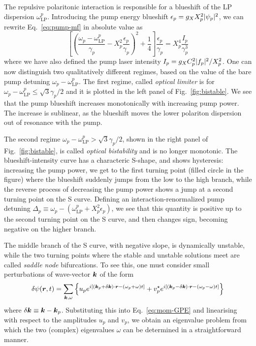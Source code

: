 The repulsive polaritonic interaction is responsible for a blueshift
of the LP dispersion $\omega_{\text{LP}}^{p}$.  Introducing the pump energy blueshift
$\epsilon_p = g_X X_p^2 \vert \psi_p \vert^2$, we can rewrite
Eq.~\eqref{eq:pump-mf} in absolute value as
%
\begin{equation}\label{eq:pump-mf-sq}
  \left[\left(\frac{\omega_p-\omega^p_{\text{LP}}}{\gamma_p} - X_p^2 \frac{\epsilon_p}{\gamma_p}\right)^2 + \frac{1}{4} \right] \frac{\epsilon_p}{\gamma_p} = X_p^4 \frac{I_p}{\gamma_p^3}
\end{equation}
%
where we have also defined the pump laser intensity
$I_p = g_X C_p^2 \vert f_p \vert^2/X_p^2$. One can now distinguish two
qualitatively different regimes, based on the value of the bare pump
detuning $\omega_p-\omega^p_{\text{LP}}$. The first regime, called
\textit{optical limiter} is for
$\omega_p-\omega^p_{\text{LP}} \leq \sqrt{3}\gamma_p/2$ and it is
plotted in the left panel of Fig.~\ref{fig:bistable}. We see that the
pump blueshift increases monotonically with increasing pump power. The
increase is sublinear, as the blueshift moves the lower polariton
dispersion out of resonance with the pump.

The second regime
$\omega_p-\omega^p_{\text{LP}} > \sqrt{3}\gamma_p/2$, shown in the
right panel of Fig.~\ref{fig:bistable}, is called \textit{optical
  bistability} and is no longer monotonic. The blueshift-intensity
curve has a characteric S-shape, and shows hysteresis: increasing the
pump power, we get to the first turning point (filled circle in the
figure) where the blueshift suddenly jumps from the low to the high
branch, while the reverse process of decreasing the pump power shows a
jump at a second turning point on the S curve. Defining an
interaction-renormalized pump detuning
$\Delta_p \equiv \omega_p-(\omega^p_{\text{LP}} + X_p^2\epsilon_p)$,
we see that this quantity is positive up to the second turning point
on the S curve, and then changes sign, becoming negative on the higher
branch.

The middle branch of the S curve, with negative slope, is dynamically
unstable, while the two turning points where the stable and unstable
solutions meet are called \textit{saddle node} bifurcations.  To see
this, one must consider small perturbations of wave-vector $\bm{k}$ of
the form
%
\begin{equation}\label{eq:pump-fluctuations}
  \delta \psi(\bm{r},t) = \sum_{\bm{k},\omega} \left\{ u_p e^{i [(\bm{k}_p + \delta\bm{k}) \cdot \bm{r} - (\omega_p + \omega) t ]}  + v_p^{\star}e^{i[ (\bm{k}_p - \delta\bm{k}) \cdot \bm{r}- (\omega_p - \omega) t]} \right\}
\end{equation}
% 
where $\delta\bm{k} \equiv \bm{k} - \bm{k}_p$. Substituting this into
Eq.~\eqref{eq:mom-GPE} and linearising with respect to the amplitudes
$u_p$ and $v_p$, we obtain an eigenvalue problem from which the two
(complex) eigenvalues $\omega$ can be determined in a straightforward
manner. 

